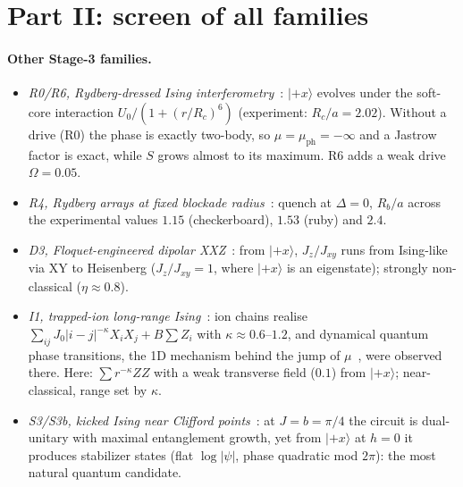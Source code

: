 \documentclass[11pt,a4paper]{article}
\begin{document}
\section{Part II: screen of all families}
\label{app:screen}

\paragraph{Other Stage-3 families.}
\begin{itemize}
  \item \emph{R0/R6, Rydberg-dressed Ising interferometry}~\cite{Zeiher16,Zeiher17,Borish20}: $|{+}x\rangle$ evolves
    under the soft-core interaction $U_0/(1+(r/R_c)^6)$ (experiment: $R_c/a=2.02$). Without a drive (R0) the phase is
    exactly two-body, so $\mu=\mu_{\mathrm{ph}}=-\infty$ and a Jastrow factor is exact, while $S$ grows almost to its
    maximum. R6 adds a weak drive $\Omega=0.05$.
  \item \emph{R4, Rydberg arrays at fixed blockade radius}~\cite{Ebadi21,Samajdar20,Semeghini21,Verresen21}: quench at
    $\Delta=0$, $R_b/a$ across the experimental values $1.15$ (checkerboard), $1.53$ (ruby) and $2.4$.
  \item \emph{D3, Floquet-engineered dipolar XXZ}~\cite{Scholl22,Geier21}: from $|{+}x\rangle$, $J_z/J_{xy}$ runs from
    Ising-like via XY to Heisenberg ($J_z/J_{xy}=1$, where $|{+}x\rangle$ is an eigenstate); strongly non-classical
    ($\eta\approx0.8$).
  \item \emph{I1, trapped-ion long-range Ising}~\cite{Richerme14,Jurcevic14,Jurcevic17,Zhang17}: ion chains realise
    $\sum_{ij}J_0|i-j|^{-\kappa}X_iX_j+B\sum Z_i$ with $\kappa\approx0.6$--$1.2$, and dynamical quantum phase
    transitions, the 1D mechanism behind the jump of $\mu$~\cite{Heyl13}, were observed there. Here: $\sum
    r^{-\kappa}ZZ$ with a weak transverse field ($0.1$) from $|{+}x\rangle$; near-classical, range set by $\kappa$.
  \item \emph{S3/S3b, kicked Ising near Clifford points}~\cite{Kim23,Tindall24,Begusic24,BKP18,BKP19}: at $J=b=\pi/4$
    the circuit is dual-unitary with maximal entanglement growth, yet from $|{+}x\rangle$ at $h=0$ it produces
    stabilizer states (flat $\log|\psi|$, phase quadratic mod $2\pi$): the most natural quantum candidate.
\end{itemize}
\end{document}
